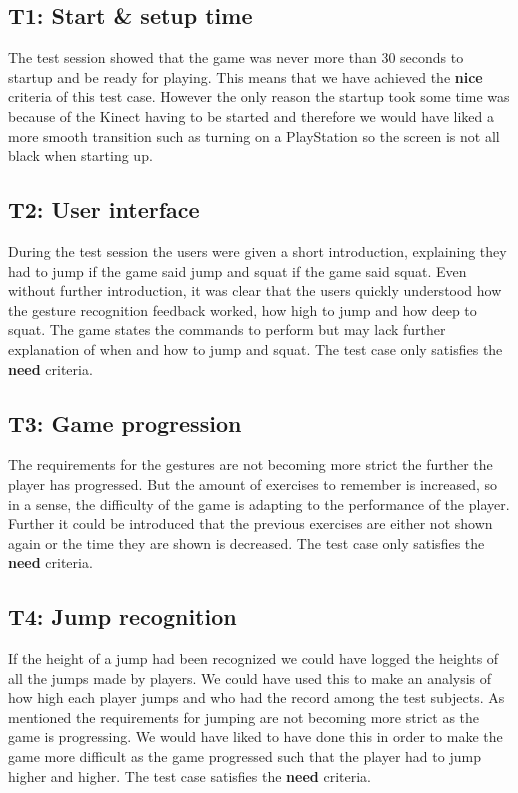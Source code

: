 \documentclass[11pt]{report}
\begin{document}
\subsection*{T1: Start \& setup time}
The test session showed that the game was never more than 30 seconds to startup and be ready for playing. This means that we have achieved the \textbf{nice} criteria of this test case. However the only reason the startup took some time was because of the Kinect having to be started and therefore we would have liked a more smooth transition such as turning on a PlayStation so the screen is not all black when starting up.

\subsection*{T2: User interface}
During the test session the users were given a short introduction, explaining they had to jump if the game said jump and squat if the game said squat. Even without further introduction, it was clear that the users quickly understood how the gesture recognition feedback worked, how high to jump and how deep to squat. The game states the commands to perform but may lack further explanation of when and how to jump and squat. The test case only satisfies the \textbf{need} criteria.

\subsection*{T3: Game progression}
The requirements for the gestures are not becoming more strict the further the player has progressed. But the amount of exercises to remember is increased, so in a sense, the difficulty of the game is adapting to the performance of the player. Further it could be introduced that the previous exercises are either not shown again or the time they are shown is decreased. The test case only satisfies the \textbf{need} criteria.

\subsection*{T4: Jump recognition}
If the height of a jump had been recognized we could have logged the heights of all the jumps made by players. We could have used this to make an analysis of how high each player jumps and who had the record among the test subjects. As mentioned the requirements for jumping are not becoming more strict as the game is progressing. We would have liked to have done this in order to make the game more difficult as the game progressed such that the player had to jump higher and higher. The test case satisfies the \textbf{need} criteria.
\end{document}
